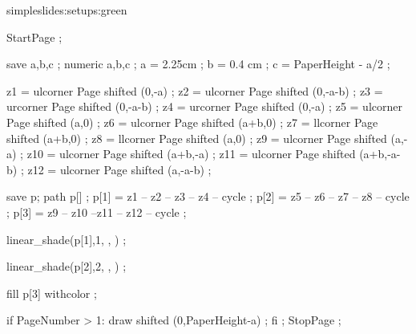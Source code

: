 \startsetups simpleslides:setups:green
\stopsetups





\unexpanded{}

StartPage ;

save a,b,c ; numeric a,b,c ;
a = 2.25cm ;
b = 0.4 cm ;
c = PaperHeight - a/2 ;

z1 = ulcorner Page shifted (0,-a) ;
z2 = ulcorner Page shifted (0,-a-b) ;
z3 = urcorner Page shifted (0,-a-b) ;
z4 = urcorner Page shifted (0,-a) ;
z5 = ulcorner Page shifted (a,0) ;
z6 = ulcorner Page shifted (a+b,0) ;
z7 = llcorner Page shifted (a+b,0) ;
z8 = llcorner Page shifted (a,0) ;
z9 = ulcorner Page shifted (a,-a) ;
z10 = ulcorner Page shifted (a+b,-a) ;
z11 = ulcorner Page shifted (a+b,-a-b) ;
z12 = ulcorner Page shifted (a,-a-b) ;

save p; path p[] ;
p[1] = z1 -- z2 -- z3 -- z4 -- cycle ;
p[2] = z5 -- z6 -- z7 -- z8 -- cycle ;
p[3] = z9 -- z10 --z11 -- z12 -- cycle ;

linear_shade(p[1],1,
             ,
             ) ;

linear_shade(p[2],2,
             ,
             ) ;

fill p[3] withcolor  ;

if PageNumber > 1:
	draw  shifted (0,PaperHeight-a) ;
fi ;
StopPage ;
\stopuseMPgraphic


